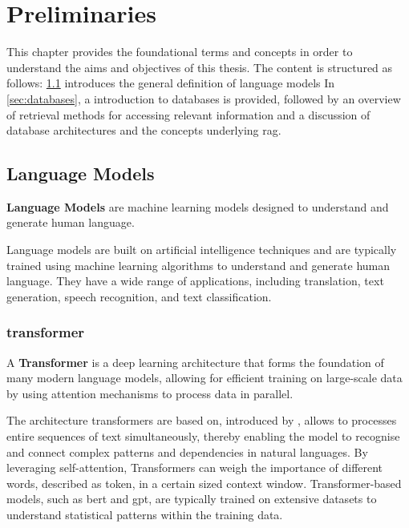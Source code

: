 \chapter{Preliminaries}\label{ch:preliminaries}
This chapter provides the foundational terms and concepts in order to understand the aims and objectives of this thesis.
The  content is structured as follows: \cref{sec:language-models} introduces the general definition of language models
In \cref{sec:databases}, a introduction to databases is provided, followed by an overview of retrieval methods for accessing relevant information and a discussion of database architectures and the concepts underlying \ac{rag}.

\section{Language Models}\label{sec:language-models}

\begin{definition}\label{def:language-models}
    \textbf{Language Models} are machine learning models designed to understand and generate human language.
\end{definition}
Language models are built on artificial intelligence techniques and are typically trained using machine learning algorithms to understand and generate human language. 
They have a wide range of applications, including translation, text generation, speech recognition, and text classification.
\subsection{transformer}\label{transformer}
\begin{definition}\label{def:transformer}
    A \textbf{Transformer} is a deep learning architecture that forms the foundation of many modern language models, allowing for efficient training on large-scale data by using attention mechanisms to process data in parallel.
\end{definition}
The architecture transformers are based on, introduced by \citet{vaswani2017attention}, allows to processes entire sequences of text simultaneously, thereby enabling the model to recognise and connect complex patterns and dependencies in natural languages. 
By leveraging self-attention, Transformers can weigh the importance of different words, described as token, in a certain sized context window. 
Transformer-based models, such as \ac{bert} and \ac{gpt}, are typically trained on extensive datasets to understand statistical patterns within the training data.\citep{atallah2023impact}

